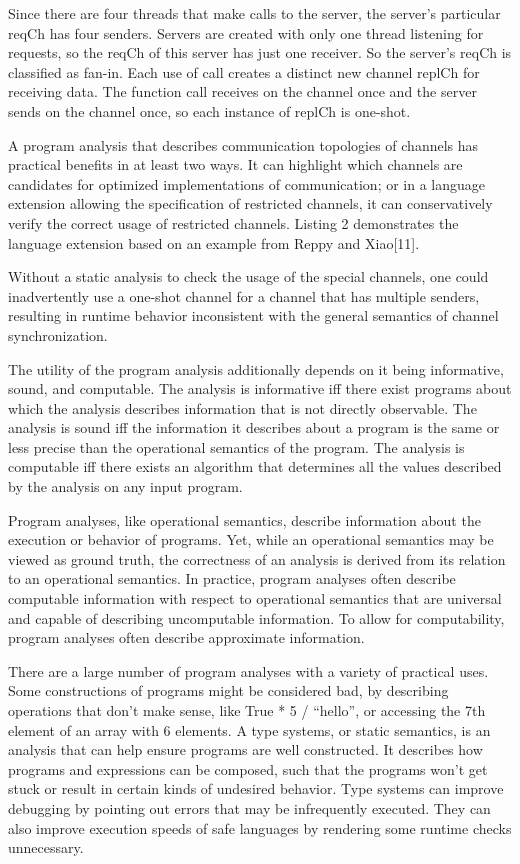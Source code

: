 \documentclass{article}
\begin{document}
Since there are four threads that make calls to the server, the server's particular reqCh has
four senders.  Servers are created with only one thread listening for requests, so the reqCh of
this server has just one receiver.  So the server's reqCh is classified as fan-in.  Each use of
call creates a distinct new channel replCh for receiving data.  The function call receives on
the channel once and the server sends on the channel once, so each instance of replCh is
one-shot.

A program analysis that describes communication topologies of channels has practical benefits
in at least two ways.  It can highlight which channels are candidates for optimized
implementations of communication; or in a language extension allowing the specification of
restricted channels, it can conservatively verify the correct usage of restricted channels.
Listing 2 demonstrates the language extension based on an example from Reppy and Xiao[11].


Without a static analysis to check the usage of the special channels, one could inadvertently
use a one-shot channel for a channel that has multiple senders, resulting in runtime behavior
inconsistent with the general semantics of channel synchronization.

The utility of the program analysis additionally depends on it being informative, sound, and
computable.  The analysis is informative iff there exist programs about which the analysis
describes information that is not directly observable.  The analysis is sound iff the
information it describes about a program is the same or less precise than the operational
semantics of the program. The analysis is computable iff there exists an algorithm that
determines all the values described by the analysis on any input program.

Program analyses, like operational semantics, describe information about the execution or
behavior of programs.  Yet, while an operational semantics may be viewed as ground truth, the
correctness of an analysis is derived from its relation to an operational semantics.  In
practice, program analyses often describe computable information with respect to operational
semantics that are universal and capable of describing uncomputable information.  To allow for
computability, program analyses often describe approximate information.

There are a large number of program analyses with a variety of practical uses.  Some
constructions of programs might be considered bad, by describing operations that don't make
sense, like True * 5 / “hello”, or accessing the 7th element of an array with 6 elements.  A
type systems, or static semantics, is an analysis that can help ensure programs are well
constructed.  It describes how programs and expressions can be composed, such that the programs
won't get stuck or result in certain kinds of undesired behavior.  Type systems can improve
debugging by pointing out errors that may be infrequently executed.  They can also improve
execution speeds of safe languages by rendering some runtime checks unnecessary.  
\end{document}
